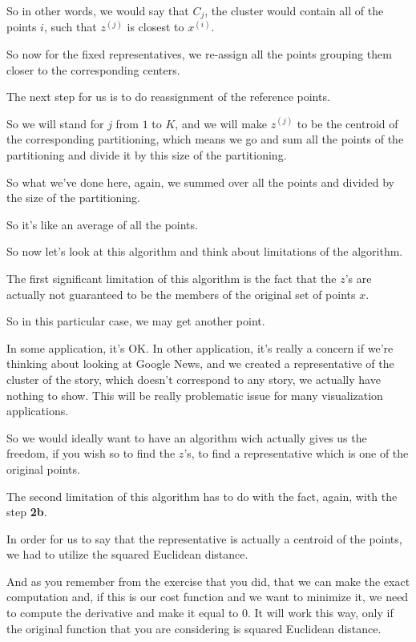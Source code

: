 \documentclass[a4paper, 12pt]{article}
\begin{document}
So in other words, we would say that \(C_j\), the cluster would contain all
of the points \(i\), such that \(z^{(j)}\) is closest to \(x^{(i)}\).

So now for the fixed representatives, we re-assign all the points grouping them
closer to the corresponding centers.

The next step for us is to do reassignment of the reference points.

So we will stand for \(j\) from \(1\) to \(K\), and we will make \(z^{(j)}\) to
be the centroid of the corresponding partitioning, which means we go and sum all
the points of the partitioning and divide it by this size of the partitioning.

So what we've done here, again, we summed over all the points and divided by the
size of the partitioning.

So it's like an average of all the points.

So now let's look at this algorithm and think about limitations of the
algorithm.

The first significant limitation of this algorithm is the fact that the \(z\)'s
are actually not guaranteed to be the members of the original set of points
\(x\).

So in this particular case, we may get another point.

In some application, it's OK. In other application, it's really a concern if
we're thinking about looking at Google News, and we created a representative of
the cluster of the story, which doesn't correspond to any story, we actually
have nothing to show. This will be really problematic issue for many
visualization applications.

So we would ideally want to have an algorithm wich actually gives us the
freedom, if you wish so to find the \(z\)'s, to find a representative which is
one of the original points.

The second limitation of this algorithm has to do with the fact, again, with the
step \textbf{2b}.

In order for us to say that the representative is actually a centroid of the
points, we had to utilize the squared Euclidean distance.

And as you remember from the exercise that you did, that we can make the exact
computation and, if this is our cost function and we want to minimize it, we
need to compute the derivative and make it equal to 0. It will work this way,
only if the original function that you are considering is squared Euclidean
distance.
\end{document}

